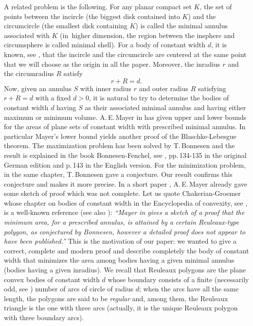 \documentclass[JEP,XML,SOM,Unicode,NoFloatCountersInSection]{cedram}
\theoremstyle{plain}
\theoremstyle{definition}
\begin{document}
A related problem is the following.
For any planar compact set $K$, the set of points between the incircle (the biggest disk contained into $K$) and the circumcircle (the smallest disk containing $K$) is
called the minimal {annulus} associated with $K$ {(in~higher dimension, the region between the insphere and circumsphere is called minimal shell).}
For a body of constant width $d$, it is known, see \cite{CG}, that the {incircle} and the {circumcircle} are centered at the
same point that we will choose as the origin in all the paper. Moreover, the inradius $r$ and the circumradius $R$
satisfy\vspace*{-3pt}%
\begin{equation}\label{inr}
r+R=d.
\end{equation}
Now, given an annulus $S$ with inner radius $r$ and outer radius $R$ satisfying $r+R=d$
with a fixed $d > 0$, it is natural to try to determine the bodies of
constant width $d$ having $S$ as their
associated minimal annulus and having either maximum or minimum volume.
A.\,E.\,Mayer in \cite{Ma1} has given upper
and lower bounds for the areas of plane sets of constant width with prescribed
minimal annulus. In particular Mayer's lower bound
yields another proof of the Blaschke-Lebesgue
theorem.
The maximization problem has been solved by T.\,Bonnesen and the result is explained in the book
Bonnesen-Fenchel, see \cite{BF}, pp.\,134-135 in the original German edition and p.\,143
in the English version.
For the minimization problem, in the same chapter, T.\,Bonnesen gave a conjecture.
Our result confirms this conjecture and makes it more precise. In a short paper
\cite{Ma2}, A.\,E.\,Mayer {already} gave some sketch of proof which was not complete.
Let us quote Chakerian-Groemer whose chapter on bodies of constant width in the Encyclopedia
of convexity, see \cite{CG}, is a well-known reference (see also \cite{MMO}):
\emph{``Mayer in \cite{Ma2} gives a sketch of a proof that the minimum
area, for a prescribed annulus, is attained by a certain Reuleaux-type polygon, as
conjectured by Bonnesen, however a detailed proof does not appear to have been
published.''}
This is the motivation of our paper: we wanted to give a correct, complete and modern proof
and describe completely the body of constant width that minimizes the area among bodies
having a given minimal annulus (\ie bodies having a given inradius).
We recall that Reuleaux polygons are the plane convex bodies of constant width $d$ whose boundary consists of a finite (necessarily odd, see \eg \cite[\S 8.1]{MMO}) number of arcs of circle of radius $d$; when the arcs have all the
same length, the polygons are said to be \emph{regular} and, among them, the Reuleaux triangle is the one with three arcs (actually, it is the unique Reuleaux polygon with three boundary arcs).
\end{document}
